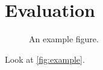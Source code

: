 \section{Evaluation}%
\label{sec:eval}

\begin{figure}%
\centering
%
\caption{An example figure.}%
\label{fig:example}%
\end{figure}

Look at \autoref{fig:example}.
